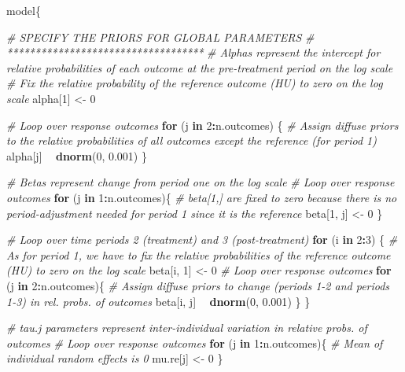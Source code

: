 \documentclass[]{article}
\newenvironment{Shaded}{\begin{snugshade}}{\end{snugshade}}
\newcommand{\CommentTok}[1]{\textcolor[rgb]{0.56,0.35,0.01}{\textit{#1}}}
\newcommand{\ControlFlowTok}[1]{\textcolor[rgb]{0.13,0.29,0.53}{\textbf{#1}}}
\newcommand{\DecValTok}[1]{\textcolor[rgb]{0.00,0.00,0.81}{#1}}
\newcommand{\FloatTok}[1]{\textcolor[rgb]{0.00,0.00,0.81}{#1}}
\newcommand{\KeywordTok}[1]{\textcolor[rgb]{0.13,0.29,0.53}{\textbf{#1}}}
\newcommand{\NormalTok}[1]{#1}
\newcommand{\OperatorTok}[1]{\textcolor[rgb]{0.81,0.36,0.00}{\textbf{#1}}}
\newcommand{\StringTok}[1]{\textcolor[rgb]{0.31,0.60,0.02}{#1}}
\begin{document}
\begin{Shaded}
\begin{Highlighting}[]
\NormalTok{model\{}
  
  \CommentTok{# SPECIFY THE PRIORS FOR GLOBAL PARAMETERS}
  \CommentTok{# ***********************************}
  \CommentTok{# Alphas represent the intercept for relative probabilities of each outcome at the pre-treatment period on the log scale}
  \CommentTok{# Fix the relative probability of the reference outcome (HU) to zero on the log scale}
\NormalTok{  alpha[}\DecValTok{1}\NormalTok{] <-}\StringTok{ }\DecValTok{0}  
  
  \CommentTok{# Loop over response outcomes}
  \ControlFlowTok{for}\NormalTok{ (j }\ControlFlowTok{in} \DecValTok{2}\OperatorTok{:}\NormalTok{n.outcomes) \{   }
    \CommentTok{# Assign diffuse priors to the relative probabilities of all outcomes except the reference (for period 1)}
\NormalTok{    alpha[j] }\OperatorTok{~}\StringTok{ }\KeywordTok{dnorm}\NormalTok{(}\DecValTok{0}\NormalTok{, }\FloatTok{0.001}\NormalTok{)  }
\NormalTok{  \}}
  
  \CommentTok{# Betas represent change from period one on the log scale}
  \CommentTok{# Loop over response outcomes}
  \ControlFlowTok{for}\NormalTok{ (j }\ControlFlowTok{in} \DecValTok{1}\OperatorTok{:}\NormalTok{n.outcomes)\{}
    \CommentTok{# beta[1,] are fixed to zero because there is no period-adjustment needed for period 1 since it is the reference}
\NormalTok{    beta[}\DecValTok{1}\NormalTok{, j] <-}\StringTok{ }\DecValTok{0}   
\NormalTok{  \}}
  
  \CommentTok{# Loop over time periods 2 (treatment) and 3 (post-treatment)}
  \ControlFlowTok{for}\NormalTok{ (i }\ControlFlowTok{in} \DecValTok{2}\OperatorTok{:}\DecValTok{3}\NormalTok{) \{ }
    \CommentTok{# As for period 1, we have to fix the relative probabilities of the reference outcome (HU) to zero on the log scale}
\NormalTok{    beta[i, }\DecValTok{1}\NormalTok{] <-}\StringTok{ }\DecValTok{0}
    \CommentTok{# Loop over response outcomes}
    \ControlFlowTok{for}\NormalTok{ (j }\ControlFlowTok{in} \DecValTok{2}\OperatorTok{:}\NormalTok{n.outcomes)\{}
      \CommentTok{# Assign diffuse priors to change (periods 1-2 and periods 1-3) in rel. probs. of outcomes}
\NormalTok{      beta[i, j] }\OperatorTok{~}\StringTok{ }\KeywordTok{dnorm}\NormalTok{(}\DecValTok{0}\NormalTok{, }\FloatTok{0.001}\NormalTok{)   }
\NormalTok{      \} }
\NormalTok{  \}}
  
  \CommentTok{# tau.j parameters represent inter-individual variation in relative probs. of outcomes}
  \CommentTok{# Loop over response outcomes}
  \ControlFlowTok{for}\NormalTok{ (j }\ControlFlowTok{in} \DecValTok{1}\OperatorTok{:}\NormalTok{n.outcomes)\{  }
    \CommentTok{# Mean of individual random effects is 0}
\NormalTok{    mu.re[j] <-}\StringTok{ }\DecValTok{0}           
\NormalTok{  \}}
  

\end{Highlighting}
\end{Shaded}
\end{document}
